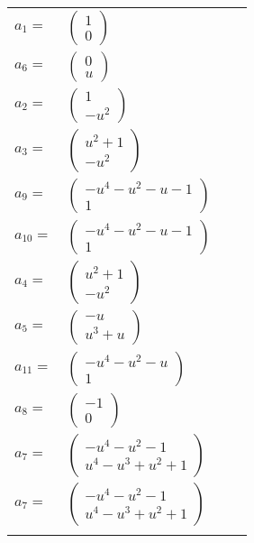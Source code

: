 \documentclass[1p]{elsarticle_modified}
\theoremstyle{definition}
\begin{document}
\begin{tabular}{m{7pt} m{180pt} m{7pt} m{180pt} }
\flushright $a_{1}=$&$\begin{pmatrix}1\\0\end{pmatrix}$ \\
\flushright $a_{6}=$&$\begin{pmatrix}0\\u\end{pmatrix}$ \\
\flushright $a_{2}=$&$\begin{pmatrix}1\\- u^2\end{pmatrix}$ \\
\flushright $a_{3}=$&$\begin{pmatrix}u^2+1\\- u^2\end{pmatrix}$ \\
\flushright $a_{9}=$&$\begin{pmatrix}- u^4- u^2- u-1\\1\end{pmatrix}$ \\
\flushright $a_{10}=$&$\begin{pmatrix}- u^4- u^2- u-1\\1\end{pmatrix}$ \\
\flushright $a_{4}=$&$\begin{pmatrix}u^2+1\\- u^2\end{pmatrix}$ \\
\flushright $a_{5}=$&$\begin{pmatrix}- u\\u^3+u\end{pmatrix}$ \\
\flushright $a_{11}=$&$\begin{pmatrix}- u^4- u^2- u\\1\end{pmatrix}$ \\
\flushright $a_{8}=$&$\begin{pmatrix}-1\\0\end{pmatrix}$ \\
\flushright $a_{7}=$&$\begin{pmatrix}- u^4- u^2-1\\u^4- u^3+u^2+1\end{pmatrix}$\\ \flushright $a_{7}=$&$\begin{pmatrix}- u^4- u^2-1\\u^4- u^3+u^2+1\end{pmatrix}$\\&\end{tabular}
\end{document}
